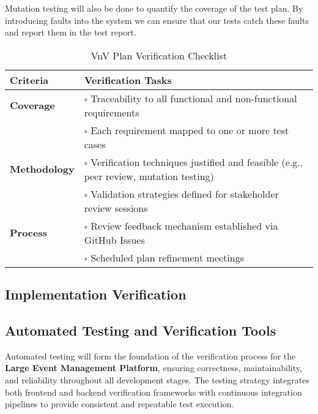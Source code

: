 \documentclass[12pt, titlepage]{article}
\begin{document}
Mutation testing will also be done to quantify the coverage of the test plan. By introducing faults into the system we can ensure that our tests catch these faults and report them in the test report.

\begin{table}[H]
\centering
\caption{VnV Plan Verification Checklist}
\begin{tabular}{p{4cm}p{10cm}}
\toprule
\textbf{Criteria} & \textbf{Verification Tasks} \\
\midrule
\textbf{Coverage} &
$\square$ Traceability to all functional and non-functional requirements \\
& $\square$ Each requirement mapped to one or more test cases \\[0.5em]
\hline
\textbf{Methodology} &
$\square$ Verification techniques justified and feasible (e.g., peer review, mutation testing) \\
& $\square$ Validation strategies defined for stakeholder review sessions \\[0.5em]
\hline
\textbf{Process} &
$\square$ Review feedback mechanism established via GitHub Issues \\
& $\square$ Scheduled plan refinement meetings \\[0.5em]
\bottomrule
\end{tabular}
\end{table}

\subsection{Implementation Verification}




\subsection{Automated Testing and Verification Tools}

Automated testing will form the foundation of the verification process for the \textbf{Large Event Management Platform}, ensuring correctness, maintainability, and reliability throughout all development stages. The testing strategy integrates both frontend and backend verification frameworks with continuous integration pipelines to provide consistent and repeatable test execution.
\end{document}
